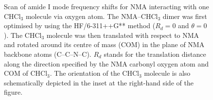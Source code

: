 \documentclass[a4paper,titlepage,twoside,fleqn,12pt]{book}
\begin{document}
\begin{refsection}
{\begin{figure}[t!]
{}
\caption{
Scan of amide I mode frequency shifts for NMA interacting 
with one CHCl$_3$ molecule via oxygen atom.
The NMA--CHCl$_3$ dimer was first optimised
by using the HF/6-311++G** method 
($R_d = 0$ and $\theta = 0$). 
The CHCl$_3$ molecule was then translated with respect to 
NMA and rotated around its centre of mass (COM) in the plane 
of NMA backbone atoms (C--C--N--C). $R_d$ stands for the translation 
distance along the direction specified by the NMA
carbonyl oxygen atom and COM of CHCl$_3$. The orientation of the CHCl$_3$
molecule is also schematically depicted in the inset at the 
right\hyp{}hand side of the figure.
\label{f:nma-orient-d}}
\end{figure}
\clearpage
}
%
\end{refsection}
\end{document}
